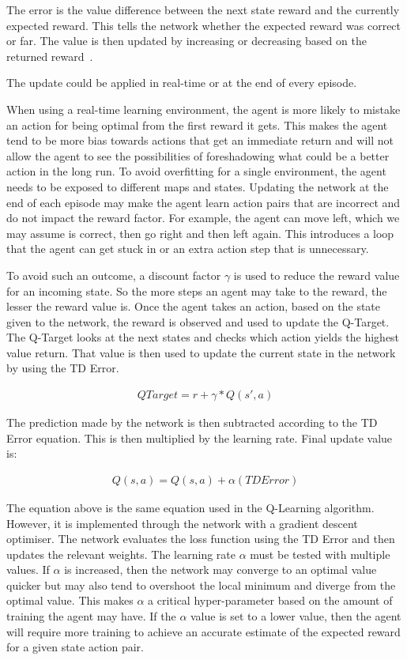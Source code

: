 The error is the value difference between the next state reward and the
currently expected reward. This tells the network whether the expected reward
was correct or far. The value is then updated by increasing or decreasing based
on the returned reward~\cite{pandey2010reinforcement}.

The update could be applied in real-time or at the end of every episode.

When using a real-time learning environment, the agent is more likely to mistake
an action for being optimal from the first reward it gets. This makes the agent
tend to be more bias towards actions that get an immediate return and will not
allow the agent to see the possibilities of foreshadowing what could be a better
action in the long run. To avoid overfitting for a single environment, the agent
needs to be exposed to different maps and states. Updating the network at the
end of each episode may make the agent learn action pairs that are incorrect and
do not impact the reward factor. For example, the agent can move left, which we
may assume is correct, then go right and then left again. This introduces a loop
that the agent can get stuck in or an extra action step that is unnecessary.

To avoid such an outcome, a discount factor $\gamma$ is used to reduce the
reward value for an incoming state. So the more steps an agent may take to the
reward, the lesser the reward value is. Once the agent takes an action, based on
the state given to the network, the reward is observed and used to update the
Q-Target. The Q-Target looks at the next states and checks which action yields
the highest value return. That value is then used to update the current state in
the network by using the TD Error.

\begin{align}
    QTarget = r + \gamma*Q(s',a)
\end{align}

The prediction made by the network is then subtracted according to the TD Error
equation. This is then multiplied by the learning rate. Final update value
is:

\begin{align}
    Q(s,a) = Q(s,a) + \alpha (TDError)
\end{align}

The equation above is the same equation used in the Q-Learning algorithm.
However, it is implemented through the network with a gradient descent
optimiser. The network evaluates the loss function using the TD Error and then
updates the relevant weights. The learning rate $\alpha$ must be tested with
multiple values. If $\alpha$ is increased, then the network may converge to an
optimal value quicker but may also tend to overshoot the local minimum and
diverge from the optimal value. This makes $\alpha$ a critical hyper-parameter
based on the amount of training the agent may have. If the $\alpha$ value is set
to a lower value, then the agent will require more training to achieve an
accurate estimate of the expected reward for a given state action pair.

